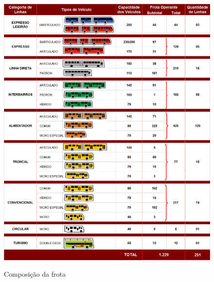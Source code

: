  \begin{figure}[!h]
 \caption{Composição da frota}
     \centering
     \includegraphics[scale=.40]{./Capitulo3/img/composicao-frota.png}
         \label{fig:linhas}
 \end{figure}


